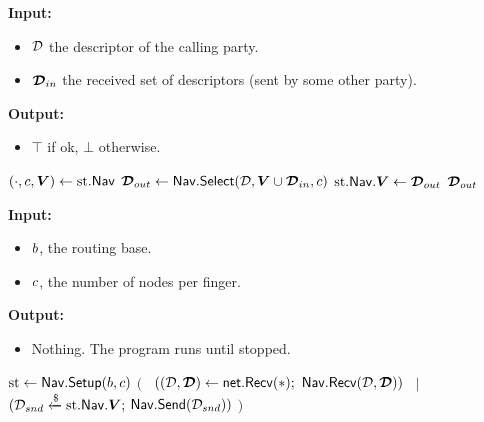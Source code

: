 \begin{algorithm}[H]
\caption{\navrecv}
\label{alg:navrecv}
\textbf{Input:}
\begin{itemize}
\vspace{-.8em}
\itemsep0em 
    \item $\mathcal{D}$ the descriptor of the calling party.
    \item $\boldsymbol{\mathcal{D}}_{in}$ the received set of descriptors (sent by some other party).
\end{itemize}
\textbf{Output:}
\begin{itemize}
\vspace{-.8em}
\itemsep0em 
    \item $\top$ if ok, $\bot$ otherwise.
\end{itemize}
\begin{algorithmic}
    \State $(\cdot,c,\boldsymbol{V}) \gets \text{st}.\mathsf{Nav}$
    \State $\boldsymbol{\mathcal{D}}_{out} \gets \mathsf{Nav}.\mathsf{Select}(\mathcal{D},\boldsymbol{V}\cup\boldsymbol{\mathcal{D}}_{in},c)$
    \State $\text{st}.\mathsf{Nav}.\boldsymbol{V} \gets \boldsymbol{\mathcal{D}}_{out}$
    \State \Return $\boldsymbol{\mathcal{D}}_{out}$
\end{algorithmic}
\end{algorithm}

\begin{algorithm}[H]
\caption{\navrun}
\label{alg:navrun}
\textbf{Input:}
\begin{itemize}
\vspace{-.8em}
\itemsep0em 
    \item $b$, the routing base.
    \item $c$, the number of nodes per finger.
\end{itemize}
\textbf{Output:}
\begin{itemize}
\vspace{-.8em}
\itemsep0em 
    \item Nothing. The program runs until stopped.
\end{itemize}
\begin{algorithmic}
\State $\text{st} \gets \mathsf{Nav}.\mathsf{Setup}(b,c)$
\State {}
\State $($
\State ~$((\mathcal{D},\boldsymbol{\mathcal{D}}) \gets \mathsf{net}.\mathsf{Recv}(\ast);$ $\mathsf{Nav}.\mathsf{Recv}(\mathcal{D}, \boldsymbol{\mathcal{D}}))$
\State ~$|$
%
\State ~$(\mathcal{D}_{snd} \mathrel{\xleftarrow{\$}} \text{st}.\mathsf{Nav}.\boldsymbol{V};$ $\mathsf{Nav}.\mathsf{Send}(\mathcal{D}_{snd}))$
\State $)$
\EndWhile
\end{algorithmic}
\end{algorithm}